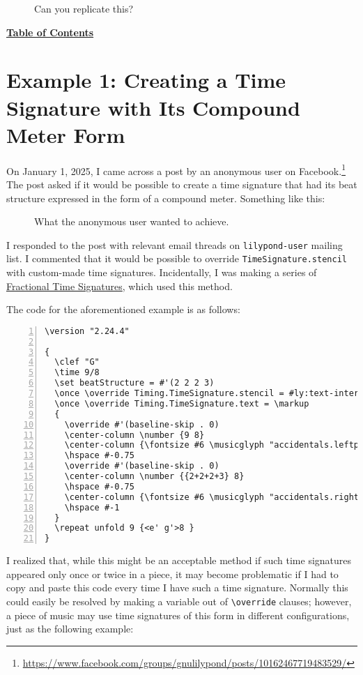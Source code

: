 	\begin{figure}[!htb]
	\centering
{}
	\caption{\label{fig:figure4} Can you replicate this?}
	\end{figure}
\hyperref[sec:toc]{\textbf{Table of Contents}}

\vfill \break
\clearpage

\section {Example 1: Creating a Time Signature with Its Compound Meter Form}

On January 1, 2025, I came across a post by an anonymous user on Facebook.\footnote{\url{https://www.facebook.com/groups/gnulilypond/posts/10162467719483529/}} The post asked if it would be possible to create a time signature that had its beat structure expressed in the form of a compound meter. Something like this:

\begin{figure}[!htb]
\centering
{}
\caption{\label{fig:figure5} What the anonymous user wanted to achieve.}
\end{figure}

I responded to the post with relevant email threads on \verb|lilypond-user| mailing list. I commented that it would be possible to override \verb|TimeSignature.stencil| with custom-made time signatures. Incidentally, I was making a series of \hyperref[sec:time_signatures]{Fractional Time Signatures}, which used this method. 

The code for the aforementioned example is as follows:
\begin{Verbatim}[numbers=left,xleftmargin=5mm]
\version "2.24.4"

{
  \clef "G"
  \time 9/8
  \set beatStructure = #'(2 2 2 3)
  \once \override Timing.TimeSignature.stencil = #ly:text-interface::print
  \once \override Timing.TimeSignature.text = \markup
  {
    \override #'(baseline-skip . 0)
    \center-column \number {9 8}
    \center-column {\fontsize #6 \musicglyph "accidentals.leftparen"}
    \hspace #-0.75
    \override #'(baseline-skip . 0)
    \center-column \number {{2+2+2+3} 8}
    \hspace #-0.75
    \center-column {\fontsize #6 \musicglyph "accidentals.rightparen"}
    \hspace #-1
  }
  \repeat unfold 9 {<e' g'>8 }
}
\end{Verbatim}

I realized that, while this might be an acceptable method if such time signatures appeared only once or twice in a piece, it may become problematic if I had to copy and paste this code every time I have such a time signature. Normally this could easily be resolved by making a variable out of \verb|\override| clauses; however, a piece of music may use time signatures of this form in different configurations, just as the following example:


